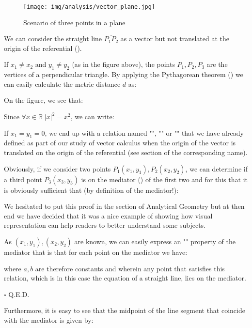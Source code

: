 \begin{figure}[H]
\centering
\texttt{[image: img/analysis/vector\_plane.jpg]}
\caption[]{Scenario of three points in a plane}
\end{figure}

We can consider the straight line $\overline{P_1P_2}$ as a vector but not translated at the origin of the referential ().

If $x_1\neq x_2$ and $y_1\neq y_2$ (as in the figure above), the points $P_1,P_2,P_3$ are the vertices of a perpendicular triangle. By applying the Pythagorean theorem () we can easily calculate the metric distance $d$ as:
	
	On the figure, we see that:
	
	Since $\forall x \in \mathbb{R} \; \vert x \vert ^2 =x^2$, we can write:
	
	If $x_1=y_1=0$, we end up with a relation named "", "" or "" that we have already defined as part of our study of vector calculus when the origin of the vector is translated on the origin of the referential (see section of the corresponding name).
	
	\begin{theorem}
	Obviously, if we consider two points $P_1(x_1,y_1),P_2(x_2,y_2)$, we can determine if a third point $P_3(x_3,y_3)$ is on the mediator () of the first two and for this that it is obviously sufficient that (by definition of the mediator!):
	
	\end{theorem}
	\begin{tcolorbox}[title=Remark,colframe=black,arc=10pt]
	We hesitated to put this proof in the section of Analytical Geometry but at then end we have decided that it was a nice example of showing how visual representation can help readers to better understand some subjects.
	\end{tcolorbox}	
	\begin{dem}
	As $(x_1,y_1),(x_2,y_2)$ are known, we can easily express an "" property of the mediator that is that for each point on the mediator we have:
	
	where $a, b$ are therefore constants and wherein any point that satisfies this relation, which is in this case the equation of a straight line, lies on the mediator.
	\begin{flushright}
		$\square$  Q.E.D.
	\end{flushright}
	\end{dem}
	Furthermore, it is easy to see that the midpoint of the line segment that coincide with the mediator is given by:
	
